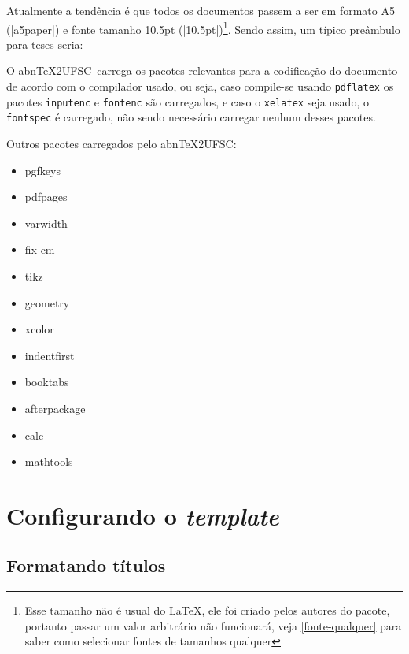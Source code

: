 \documentclass[openright,draft]{memoir}
\newcommand*{\abntexUFSC}{abn\TeX2UFSC}
\begin{document}
Atualmente a tendência é que todos os documentos passem a ser em formato A5 (\code|a5paper|) e fonte tamanho 10.5pt (\code|10.5pt|)\footnote{Esse tamanho não é usual do \LaTeX, ele foi criado pelos autores do pacote, portanto passar um valor arbitrário não funcionará, veja \autoref{fonte-qualquer} para saber como selecionar fontes de tamanhos qualquer}. Sendo assim, um típico preâmbulo para teses seria:


O \abntexUFSC\ carrega os pacotes relevantes para a codificação do documento de acordo com o compilador usado, ou seja, caso compile-se usando \texttt{pdflatex} os pacotes \texttt{inputenc} e \texttt{fontenc} são carregados, e caso o \texttt{xelatex} seja usado, o \texttt{fontspec} é carregado, não sendo necessário carregar nenhum desses pacotes.

Outros pacotes carregados pelo \abntexUFSC:
\begin{multicols}{3}
\begin{itemize}
\item pgfkeys \item pdfpages \item varwidth \item fix-cm \item tikz \item geometry
\item xcolor \item indentfirst\item booktabs \item afterpackage \item calc \item mathtools
\end{itemize}
\end{multicols}

\chapter{Configurando o \textit{template}}
\section{Formatando títulos}
\end{document}
